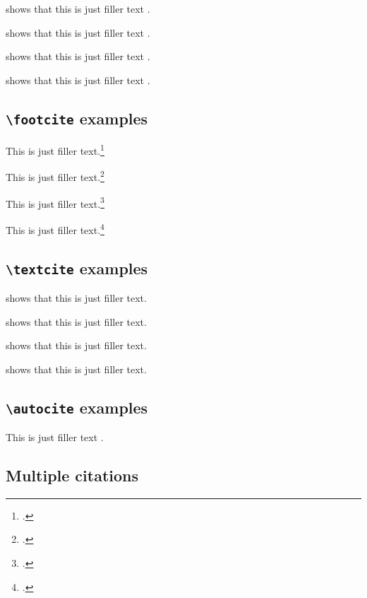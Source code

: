 \documentclass[a4paper]{article}
\newcommand{\cmd}[1]{\texttt{\textbackslash #1}}
\begin{document}
\citeauthor{aristotle:rhetoric} shows that this is just filler
text \parencite*{aristotle:rhetoric}.

\citeauthor{aristotle:rhetoric} shows that this is just filler
text \parencite*[59]{aristotle:rhetoric}.

\citeauthor{aristotle:rhetoric} shows that this is just filler
text \parencite*[see][]{aristotle:rhetoric}.

\citeauthor{aristotle:rhetoric} shows that this is just filler
text \parencite*[see][59--63]{aristotle:rhetoric}.

\subsection*{\cmd{footcite} examples}

This is just filler text.\footcite{aristotle:rhetoric}

This is just filler text.\footcite[59]{aristotle:rhetoric}

This is just filler text.\footcite[See][]{aristotle:rhetoric}

This is just filler text.\footcite[See][59--63]{aristotle:rhetoric}

\subsection*{\cmd{textcite} examples}

\textcite{aristotle:rhetoric} shows that this is just filler text.

\textcite[59]{aristotle:rhetoric} shows that this is just filler text.

\textcite[see][]{aristotle:rhetoric} shows that this is just filler text.

\textcite[see][59--63]{aristotle:rhetoric} shows that this is just filler text.

\subsection*{\cmd{autocite} examples}


This is just filler text \autocite{aristotle:rhetoric}.

\subsection*{Multiple citations}
\end{document}
